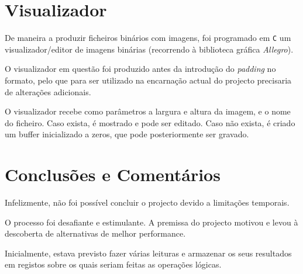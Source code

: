 \documentclass[a4paper]{article}
\begin{document}





\section{Visualizador}

De maneira a produzir ficheiros binários com imagens, foi programado em \texttt{C} um visualizador/editor de imagens binárias (recorrendo à biblioteca gráfica \emph{Allegro}).

O visualizador em questão foi produzido antes da introdução do \textit{padding} no formato, pelo que para ser utilizado na encarnação actual do projecto precisaria de alterações adicionais.

O visualizador recebe como parâmetros a largura e altura da imagem, e o nome do ficheiro. Caso exista, é mostrado e pode ser editado. Caso não exista, é criado um buffer inicializado a zeros, que pode posteriormente ser gravado.

\section{Conclusões e Comentários}

Infelizmente, não foi possível concluir o projecto devido a limitações temporais.

O processo foi desafiante e estimulante. A premissa do projecto motivou e levou à descoberta de alternativas de melhor performance.

Inicialmente, estava previsto fazer várias leituras e armazenar os seus resultados em registos sobre os quais seriam feitas as operações lógicas.
\end{document}
